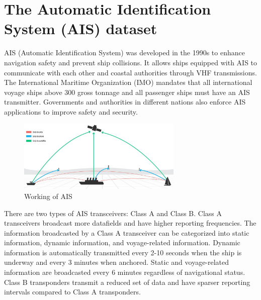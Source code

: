 \section{The Automatic Identification System (AIS) dataset}

AIS (Automatic Identification System) was developed in the 1990s to enhance navigation safety and prevent ship collisions.
It allows ships equipped with AIS to communicate with each other and coastal authorities through VHF transmissions.
The International Maritime Organization (IMO) mandates that all international voyage ships above 300 gross tonnage and all passenger ships must have an AIS transmitter.
Governments and authorities in different nations also enforce AIS applications to improve safety and security.

\begin{figure}[h]
    \centering
    \includegraphics[width=0.7\textwidth]{images/ais.jpeg}
    \caption{Working of AIS}
    \label{ais}
\end{figure}

There are two types of AIS transceivers: Class A and Class B.
Class A transceivers broadcast more datafields and have higher reporting frequencies.
The information broadcasted by a Class A transceiver can be categorized into static information, dynamic information, and voyage-related information.
Dynamic information is automatically transmitted every 2-10 seconds when the ship is underway and every 3 minutes when anchored.
Static and voyage-related information are broadcasted every 6 minutes regardless of navigational status.
Class B transponders transmit a reduced set of data and have sparser reporting intervals compared to Class A transponders.


